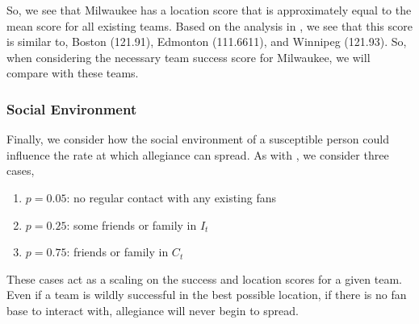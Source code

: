 \documentclass[11pt]{report}            %
\begin{document}
So, we see that Milwaukee has a location score that is approximately equal to the mean score for all existing teams. Based on the analysis in \cite{light}, we see that this score is similar to, Boston (121.91), Edmonton (111.6611), and Winnipeg (121.93). So, when considering the necessary team success score for Milwaukee, we will compare with these teams.
\subsubsection*{Social Environment}
Finally, we consider how the social environment of a susceptible person could influence the rate at which allegiance can spread. As with \cite{light}, we consider three cases,
\begin{enumerate}
\item $p=0.05$: no regular contact with any existing fans\\
\item $p=0.25$: some friends or family in $I_t$\\
\item $p=0.75$: friends or family in $C_t$
\end{enumerate}
These cases act as a scaling on the success and location scores for a given team. Even if a team is wildly successful in the best possible location, if there is no fan base to interact with, allegiance will never begin to spread.
\end{document}
